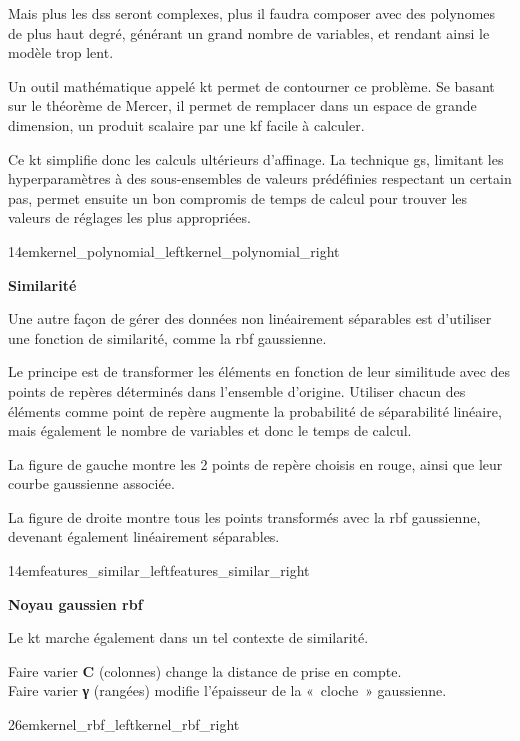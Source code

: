 Mais plus les \glspl{ds} seront complexes, plus il faudra composer avec
des polynomes de plus haut degré, générant un grand nombre de variables,
et rendant ainsi le modèle trop lent.

Un outil mathématique appelé \gls{kt} permet de contourner ce problème.
Se basant sur le théorème de Mercer, il permet de remplacer dans un espace
de grande dimension, un produit scalaire par une \gls{kf} facile à calculer.

Ce \gls{kt} simplifie donc les calculs ultérieurs d’affinage.
La technique \gls{gs}, limitant les hyperparamètres à des sous-ensembles
de valeurs prédéfinies respectant un certain pas, permet ensuite un bon
compromis de temps de calcul pour trouver les valeurs de réglages
les plus appropriées.

{14em}{kernel_polynomial_left}{kernel_polynomial_right}

\textbf{Similarité}

Une autre façon de gérer des données non linéairement séparables
est d’utiliser une fonction de similarité, comme la \gls{rbf} gaussienne.

Le principe est de transformer les éléments en fonction de leur similitude
avec des points de repères déterminés dans l’ensemble d’origine.
Utiliser chacun des éléments comme point de repère augmente la probabilité
de séparabilité linéaire, mais également le nombre de variables et donc
le temps de calcul.

La figure de gauche montre les 2 points de repère choisis en rouge,
ainsi que leur courbe gaussienne associée.

La figure de droite montre tous les points transformés avec la \gls{rbf}
gaussienne, devenant également linéairement séparables.

{14em}{features_similar_left}{features_similar_right}

\textbf{Noyau gaussien \gls{rbf}}

Le \gls{kt} marche également dans un tel contexte de similarité.

Faire varier \textbf{C} (colonnes) change la distance de prise en compte.\\
Faire varier \textbf{γ} (rangées) modifie l’épaisseur de la « cloche » gaussienne.

{26em}{kernel_rbf_left}{kernel_rbf_right}

